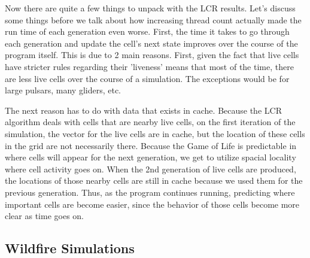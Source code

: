 \documentclass[12pt]{article}
\begin{document}
Now there are quite a few things to unpack with the LCR results. Let's discuss some things before we talk about how increasing thread count actually made the run time of each generation even worse. First, the time it takes to go through each generation and update the cell's next state improves over the course of the program itself. This is due to 2 main reasons. First, given the fact that live cells have stricter rules regarding their 'liveness' means that most of the time, there are less live cells over the course of a simulation. The exceptions would be for large pulsars, many gliders, etc.

The next reason has to do with data that exists in cache. Because the LCR algorithm deals with cells that are nearby live cells, on the first iteration of the simulation, the vector for the live cells are in cache, but the location of these cells in the grid are not necessarily there. Because the Game of Life is predictable in where cells will appear for the next generation, we get to utilize spacial locality where cell activity goes on. When the 2nd generation of live cells are produced, the locations of those nearby cells are still in cache because we used them for the previous generation. Thus, as the program continues running, predicting where important cells are become easier, since the behavior of those cells become more clear as time goes on.

\subsection{Wildfire Simulations}
\end{document}
